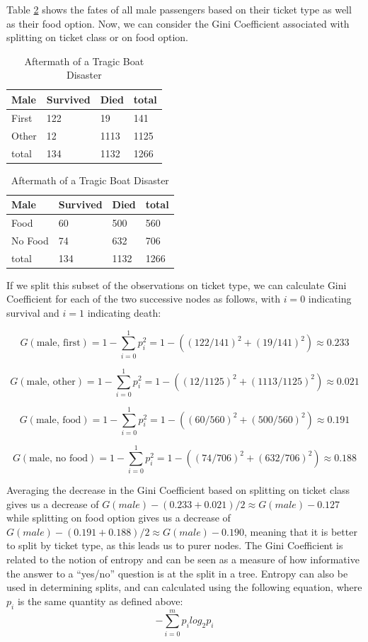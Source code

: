\documentclass[preprint,12pt]{elsarticle}
\begin{document}
Table \ref{hello} shows the fates of all male passengers based on their ticket type as well as their food option. Now, we can consider the Gini Coefficient associated with splitting on ticket class or on food option.
\begin{table}[h]
\begin{tabular}{|l | l l | l|}
\hline
 Male & Survived & Died & total\\
\hline
First & 122 & 19 & 141 \\
Other & 12 & 1113 & 1125 \\
\hline
total & 134 & 1132 & 1266 \\
\hline
\end{tabular}
\quad
\begin{tabular}{|l | l l | l|}
\hline
Male & Survived & Died & total\\
\hline
Food & 60 & 500  & 560 \\
No Food & 74 & 632 & 706 \\
\hline
total & 134 & 1132 & 1266 \\
\hline
\end{tabular}
\caption{Aftermath of a Tragic Boat Disaster}
\label{hello}
\end{table}

\noindent If we split this subset of the observations on ticket type, we can calculate Gini Coefficient for each of the two successive nodes as follows, with $i=0$ indicating survival and $i=1$ indicating death:

$$G(\textrm{male, first}) = 1 - \sum\limits_{i=0}^1 p_{i}^{2} = 1 - ((122/141)^{2}+(19/141)^{2}) \approx 0.233 $$

$$G(\textrm{male, other}) = 1 - \sum\limits_{i=0}^1 p_{i}^{2} = 1 - ((12/1125)^{2}+(1113/1125)^{2}) \approx 0.021 $$

$$G(\textrm{male, food}) = 1 - \sum\limits_{i=0}^1 p_{i}^{2} = 1 - ((60/560)^{2}+(500/560)^{2}) \approx 0.191 $$

$$G(\textrm{male, no food}) = 1 - \sum\limits_{i=0}^1 p_{i}^{2} = 1 - ((74/706)^{2}+(632/706)^{2}) \approx 0.188 $$

\noindent Averaging the decrease in the Gini Coefficient based on splitting on ticket class gives us a decrease of $G(male) - (0.233+0.021)/2 \approx G(male) - 0.127$ while splitting on food option gives us a decrease of  $G(male) - (0.191+0.188)/2 \approx G(male) - 0.190$, meaning that it is better to split by ticket type, as this leads us to purer nodes. The Gini Coefficient is related to the notion of entropy and can be seen as a measure of how informative the answer to a ``yes/no'' question is at the split in a tree. Entropy can also be used in determining splits, and can calculated using the following equation, where $p_{i}$ is the same quantity as defined above: 
$$-\sum\limits_{i=0}^m p_{i}log_{2}p_{i}$$
\end{document}
